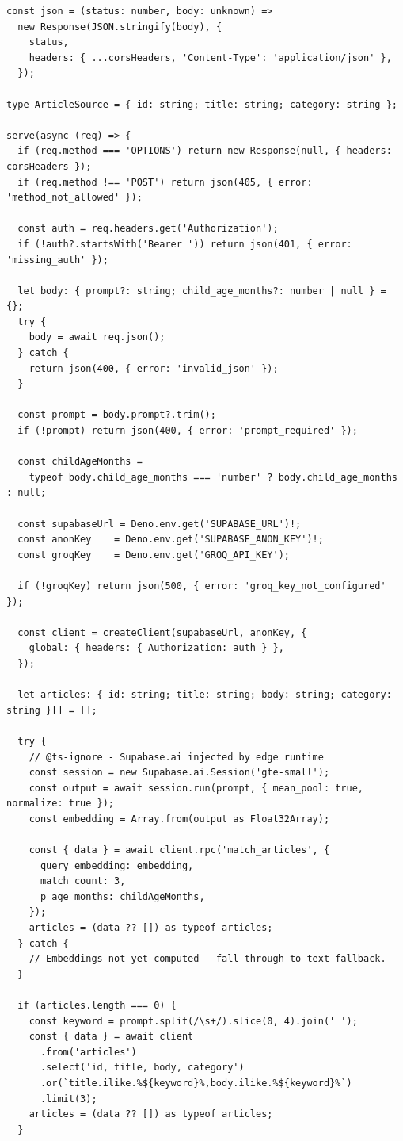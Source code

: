\documentclass[%
  ukrainian, utf8, columnvii, simple,
  hpadding=10mm, vpadding=10mm, reduceheight=2mm,
  floatsection,
]{eskdtext}
\begin{document}
{\begin{verbatim}
const json = (status: number, body: unknown) =>
  new Response(JSON.stringify(body), {
    status,
    headers: { ...corsHeaders, 'Content-Type': 'application/json' },
  });

type ArticleSource = { id: string; title: string; category: string };

serve(async (req) => {
  if (req.method === 'OPTIONS') return new Response(null, { headers: corsHeaders });
  if (req.method !== 'POST') return json(405, { error: 'method_not_allowed' });

  const auth = req.headers.get('Authorization');
  if (!auth?.startsWith('Bearer ')) return json(401, { error: 'missing_auth' });

  let body: { prompt?: string; child_age_months?: number | null } = {};
  try {
    body = await req.json();
  } catch {
    return json(400, { error: 'invalid_json' });
  }

  const prompt = body.prompt?.trim();
  if (!prompt) return json(400, { error: 'prompt_required' });

  const childAgeMonths =
    typeof body.child_age_months === 'number' ? body.child_age_months : null;

  const supabaseUrl = Deno.env.get('SUPABASE_URL')!;
  const anonKey    = Deno.env.get('SUPABASE_ANON_KEY')!;
  const groqKey    = Deno.env.get('GROQ_API_KEY');

  if (!groqKey) return json(500, { error: 'groq_key_not_configured' });

  const client = createClient(supabaseUrl, anonKey, {
    global: { headers: { Authorization: auth } },
  });

  let articles: { id: string; title: string; body: string; category: string }[] = [];

  try {
    // @ts-ignore - Supabase.ai injected by edge runtime
    const session = new Supabase.ai.Session('gte-small');
    const output = await session.run(prompt, { mean_pool: true, normalize: true });
    const embedding = Array.from(output as Float32Array);

    const { data } = await client.rpc('match_articles', {
      query_embedding: embedding,
      match_count: 3,
      p_age_months: childAgeMonths,
    });
    articles = (data ?? []) as typeof articles;
  } catch {
    // Embeddings not yet computed - fall through to text fallback.
  }

  if (articles.length === 0) {
    const keyword = prompt.split(/\s+/).slice(0, 4).join(' ');
    const { data } = await client
      .from('articles')
      .select('id, title, body, category')
      .or(`title.ilike.%${keyword}%,body.ilike.%${keyword}%`)
      .limit(3);
    articles = (data ?? []) as typeof articles;
  }


\end{verbatim}}
\end{document}
